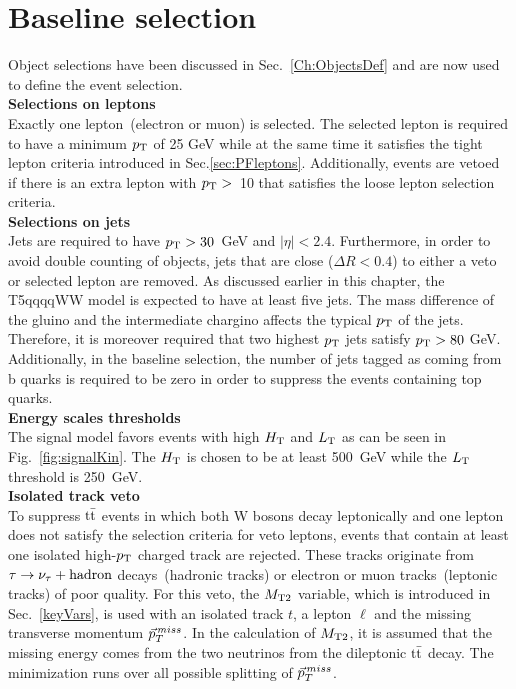 \section{Baseline selection}
\label{sec:BL}
Object selections have been discussed in Sec.~\ref{Ch:ObjectsDef} and are now used to define the event selection.\\
\textbf{Selections on leptons}\\
Exactly one lepton~(electron or muon) is selected. The selected lepton is required to have a minimum $p_{\rm T}$ of 25 GeV while at the same time it satisfies the tight lepton criteria introduced in Sec.\ref{sec:PFleptons}. Additionally, events are vetoed if there is an extra lepton with $p_{\rm T}>$~10 that satisfies the loose lepton selection criteria.\\
\textbf{Selections on jets}\\
Jets are required to have $p_{\rm T} > 30$~GeV and $| \eta | < 2.4 $. Furthermore, in order to avoid double counting of objects, jets that are close ($\Delta R <0.4$) to either a veto or selected lepton are removed.
As discussed earlier in this chapter, the T5qqqqWW model is expected to have at least five jets. The mass difference of the gluino and the intermediate chargino affects the typical $p_{\rm T}$ of the jets. Therefore, it is moreover required that two highest $p_{\rm T}$ jets satisfy $p_{\rm T} >80$ GeV. Additionally, in the baseline selection, the number of jets tagged as coming from b quarks is required to be zero in order to suppress the events containing top quarks.
\\
\textbf{Energy scales thresholds}\\
The signal model favors events with high $H_{\rm T}$ and $L_{\rm T}$ as can be seen in Fig.~\ref{fig:signalKin}. The $H_{\rm T}$ is chosen to be at least 500~GeV while the $L_{\rm T}$ threshold is 250~GeV.
\\
\textbf{Isolated track veto}\\
To suppress $\rm t\bar{t}$ events in which both W bosons decay leptonically and one lepton does not satisfy the selection criteria for veto leptons, events that contain at least one isolated high-$p_{\rm T}$ charged track are rejected. These tracks originate from $\tau \rightarrow \nu_{\tau}+{\rm hadron}$ decays~(hadronic tracks) or electron or muon tracks~(leptonic tracks) of poor quality. For this veto, the $M_\mathrm{T2}$ variable, which is introduced in Sec.~\ref{keyVars}, is used with an isolated track $t$, a lepton $\ell$ and the missing transverse momentum $\vec{p}_T^{\,miss}$. In the calculation of $M_\mathrm{T2}$, it is assumed that the missing energy comes from the two neutrinos from the dileptonic $\rm t\bar{t}$ decay. The minimization runs over all possible splitting of $\vec{p}_T^{\,miss}$.
